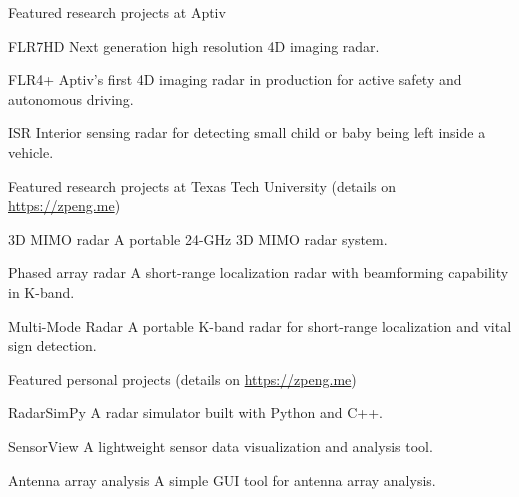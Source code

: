
Featured research projects at Aptiv

\begin{cvskills}
    \cvskill
        {FLR7HD}
        {Next generation high resolution 4D imaging radar.}

    \cvskill
        {FLR4+}
        {Aptiv’s first 4D imaging radar in production for active safety and autonomous driving.}

    \cvskill
        {ISR}
        {Interior sensing radar for detecting small child or baby being left inside a vehicle.}

\end{cvskills}

Featured research projects at Texas Tech University (details on \href{https://zpeng.me}{https://zpeng.me})

\begin{cvskills}
    \cvskill
        {3D MIMO radar}
        {A portable 24-GHz 3D MIMO radar system.}

    \cvskill
        {Phased array radar}
        {A short-range localization radar with beamforming capability in K-band.}

    \cvskill
        {Multi-Mode Radar}
        {A portable K-band radar for short-range localization and vital sign detection.}

\end{cvskills}

Featured personal projects (details on \href{https://zpeng.me}{https://zpeng.me})

\begin{cvskills}

    \cvskill
        {RadarSimPy}
        {A radar simulator built with Python and C++.}

    \cvskill
        {SensorView}
        {A lightweight sensor data visualization and analysis tool.}

    \cvskill
        {Antenna array analysis}
        {A simple GUI tool for antenna array analysis.}



\end{cvskills}

